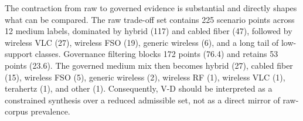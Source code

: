 {}\markdownRendererInterblockSeparator
{}\markdownRendererInterblockSeparator
{}The contraction from raw to governed evidence is substantial and directly shapes what can be compared. The raw trade-off set contains 225 scenario points across 12 medium labels, dominated by hybrid (117) and cabled fiber (47), followed by wireless VLC (27), wireless FSO (19), generic wireless (6), and a long tail of low-support classes. Governance filtering blocks 172 points (76.4\markdownRendererPercentSign{}) and retains 53 points (23.6\markdownRendererPercentSign{}). The governed medium mix then becomes hybrid (27), cabled fiber (15), wireless FSO (5), generic wireless (2), wireless RF (1), wireless VLC (1), terahertz (1), and other (1). Consequently, V-D should be interpreted as a constrained synthesis over a reduced admissible set, not as a direct mirror of raw-corpus prevalence.\markdownRendererParagraphSeparator
